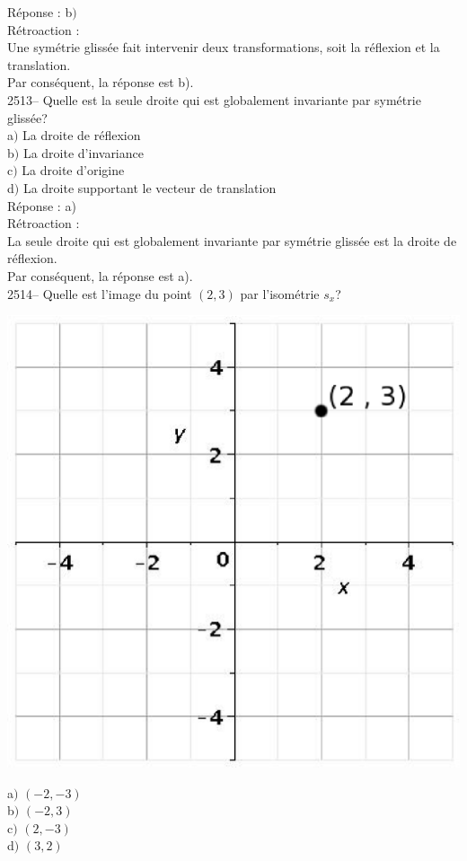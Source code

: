 \documentclass[letterpaper, 12pt]{article}
\begin{document}
R\'eponse : b$)$\\

R\'etroaction :\\
Une sym\'etrie gliss\'ee fait intervenir deux transformations, soit la r\'eflexion et la translation.\\
Par cons\'equent, la r\'eponse est b).\\

2513-- Quelle est la seule droite qui est globalement invariante par sym\'etrie gliss\'ee?\\

a$)$ La droite de r\'eflexion\\
b$)$ La droite d'invariance\\
c$)$ La droite d'origine \\
d$)$ La droite supportant le vecteur de translation\\

R\'eponse : a)\\

R\'etroaction :\\
La seule droite qui est globalement invariante par sym\'etrie gliss\'ee est la droite de r\'eflexion.\\
Par cons\'equent, la r\'eponse est a).\\


2514-- Quelle est l'image du point $(2, 3)$ par l'isom\'etrie $s_{x}$?\\
\begin{center}
 \includegraphics[width=6 cm,bb=14 14 415 415]{Q2514.eps}
\end{center}

a$)$ $(-2, -3)$\\
b$)$ $(-2, 3)$\\
c$)$ $(2, -3)$\\
d$)$ $(3, 2)$\\
\end{document}
